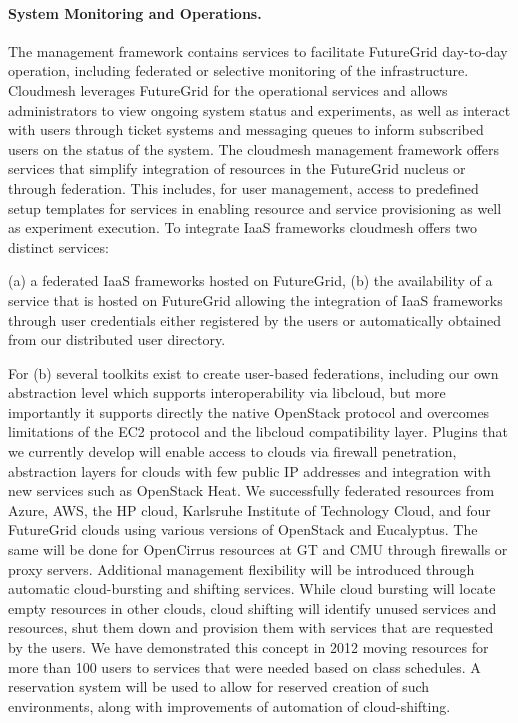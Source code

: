 \documentclass{article}
\begin{document}
\paragraph{System Monitoring and Operations.}

The management framework contains services to facilitate FutureGrid day-to-day operation, including federated or selective monitoring of the infrastructure. Cloudmesh leverages FutureGrid for the operational services and allows administrators to view ongoing system status and experiments, as well as interact with users through ticket systems and messaging queues to inform subscribed users on the status of the system.
The cloudmesh management framework offers services that simplify integration of resources in the FutureGrid nucleus or through federation. This includes, for user management, access to predefined setup templates for services in enabling resource and service provisioning as well as experiment execution. To integrate IaaS frameworks cloudmesh offers two distinct services:

(a) a federated IaaS frameworks hosted on FutureGrid,
(b) the availability of a service that is hosted on FutureGrid allowing the integration of IaaS frameworks through user credentials either registered by the users or automatically obtained from our distributed user directory.

For (b) several toolkits exist to create user-based federations, including our own abstraction level which supports interoperability via libcloud, but more importantly it supports directly the native OpenStack protocol and overcomes limitations of the EC2 protocol and the libcloud compatibility layer. Plugins that we currently develop will enable access to clouds via firewall penetration, abstraction layers for clouds with few public IP addresses and integration with new services such as OpenStack Heat. We successfully federated resources from Azure, AWS, the HP cloud, Karlsruhe Institute of Technology Cloud, and four FutureGrid clouds using various versions of OpenStack and Eucalyptus. The same will be done for OpenCirrus resources at GT and CMU through firewalls or proxy servers.
Additional management flexibility will be introduced through automatic cloud-bursting and shifting services. While cloud bursting will locate empty resources in other clouds, cloud shifting will identify unused services and resources, shut them down and provision them with services that are requested by the users. We have demonstrated this concept in 2012 moving resources for more than 100 users to services that were needed based on class schedules. A reservation system will be used to allow for reserved creation of such environments, along with improvements of automation of cloud-shifting.
\end{document}
